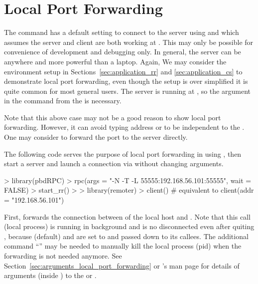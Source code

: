 \section[Local Port Forwarding]{Local Port Forwarding}
\label{sec:local_port_forwarding}

The  command  has a default setting
to connect to the  server using  and
 which assumes the  server and client are
both working at .
This may only be possible for convenience of development and debugging only.
In general, the server can be anywhere and more powerful than a laptop.
Again, We may consider the environment setup in
Sections~\ref{sec:application_rr} and \ref{sec:application_cs} to
demonstrate local port forwarding, even though the setup is over simplified
it is quite common for most general users.
The server is running at , so the argument
 in the 
command  from the 
is necessary.

Note that this above case may not be a good reason to show local port
forwarding.
However, it can avoid typing address or to be independent to the .
One may consider to forward the  port  to the
server directly.

The following code serves the purpose of local port forwarding in
 using , then start a  server and
launch a connection via  without changing arguments.
\begin{Code}[title=Forward \code{localhost:55555} to \code{192.168.56.101:55555}]
> library(pbdRPC)
> rpc(args = "-N -T -L 55555:192.168.56.101:55555", wait = FALSE)
> start_rr()
>
> library(remoter)
> client()    # equivalent to client(addr = "192.168.56.101")
\end{Code}

First, 
forwards the connection between  of the local host and
.
Note that this call (local process) is running in background and is
no disconnected even after quiting ,
because  (default) and {\color{red} }
are set to  and passed down to its callees.
{\color{red}
The additional command ``'' may be needed to manually
kill the local process (pid) when the forwarding is not needed anymore.
}
See Section~\ref{sec:arguments_local_port_forwarding} or
's man page for details of arguments 
(inside ) to the  or .

